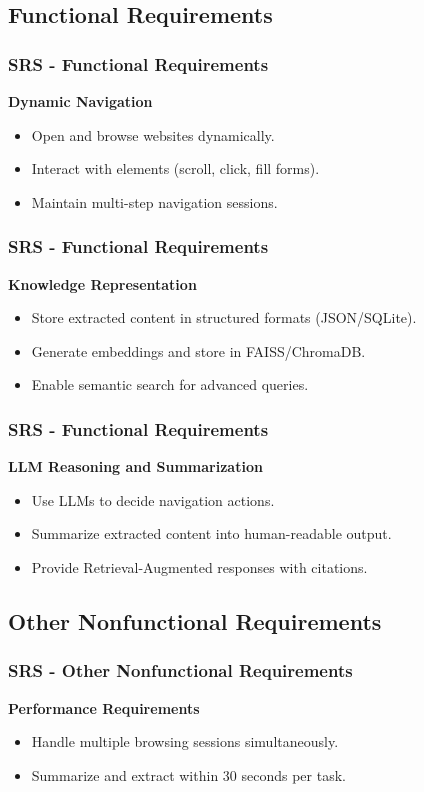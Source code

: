 \documentclass{beamer}
\begin{document}
\subsection{Functional Requirements}
\begin{frame}
\frametitle{SRS - Functional Requirements}
\textbf{Dynamic Navigation}
\begin{itemize}
    \item Open and browse websites dynamically.  
    \item Interact with elements (scroll, click, fill forms).  
    \item Maintain multi-step navigation sessions.  
\end{itemize}
\end{frame}

\begin{frame}
\frametitle{SRS - Functional Requirements}
\textbf{Knowledge Representation}
\begin{itemize}
    \item Store extracted content in structured formats (JSON/SQLite).  
    \item Generate embeddings and store in FAISS/ChromaDB.  
    \item Enable semantic search for advanced queries.  
\end{itemize}
\end{frame}

\begin{frame}
\frametitle{SRS - Functional Requirements}
\textbf{LLM Reasoning and Summarization}
\begin{itemize}
    \item Use LLMs to decide navigation actions.  
    \item Summarize extracted content into human-readable output.  
    \item Provide Retrieval-Augmented responses with citations.  
\end{itemize}
\end{frame}

\subsection{Other Nonfunctional Requirements}
\begin{frame}
\frametitle{SRS - Other Nonfunctional Requirements}
\textbf{Performance Requirements}
\begin{itemize}
    \item Handle multiple browsing sessions simultaneously.  
    \item Summarize and extract within 30 seconds per task.  
\end{itemize}
\end{frame}
\end{document}
